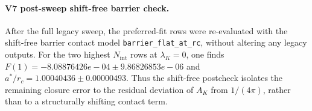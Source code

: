 \paragraph{V7 post-sweep shift-free barrier check.}
After the full legacy sweep, the preferred-fit rows were re-evaluated with the shift-free barrier contact model \texttt{barrier\_flat\_at\_rc}, without altering any legacy outputs. For the two highest $N_{\mathrm{int}}$ rows at $\lambda_K=0$, one finds $F(1) = -8.08876426e-04 \pm 9.86826853e-06$ and $a^*/r_c = 1.00040436 \pm 0.00000493$. Thus the shift-free postcheck isolates the remaining closure error to the residual deviation of $A_K$ from $1/(4\pi)$, rather than to a structurally shifting contact term.

